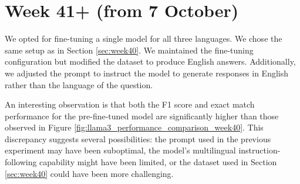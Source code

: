 \documentclass[11pt]{article}
\begin{document}
\section{Week 41+ (from 7 October)}
\label{sec:week41}

We opted for fine-tuning a single model for all three languages. We chose the same setup as in Section \ref{sec:week40}. We maintained the fine-tuning configuration but modified the dataset to produce English answers. Additionally, we adjusted the prompt to instruct the model to generate responses in English rather than the language of the question.

\begin{table}[ht]
    \centering
    \label{tab:week41_performance_comparison}
\end{table}

An interesting observation is that both the F1 score and exact match performance for the pre-fine-tuned model are significantly higher than those observed in Figure \ref{fig:llama3_performance_comparison_week40}. This discrepancy suggests several possibilities: the prompt used in the previous experiment may have been suboptimal, the model's multilingual instruction-following capability might have been limited, or the dataset used in Section \ref{sec:week40} could have been more challenging.
\end{document}
